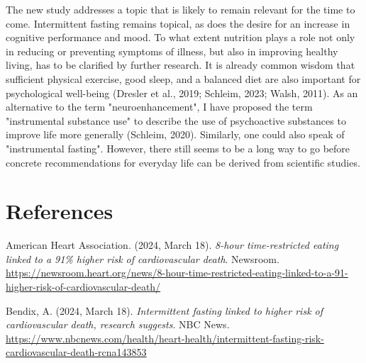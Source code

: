 \documentclass[authordate, reflection,issue]{jote-new-article}
\begin{document}
The new study addresses a topic that is likely to remain relevant for the time to come. Intermittent fasting remains topical, as does the desire for an increase in cognitive performance and mood. To what extent nutrition plays a role not only in reducing or preventing symptoms of illness, but also in improving healthy living, has to be clarified by further research. It is already common wisdom that sufficient physical exercise, good sleep, and a balanced diet are also important for psychological well-being (Dresler et al., 2019; Schleim, 2023; Walsh, 2011). As an alternative to the term "neuroenhancement", I have proposed the term "instrumental substance use" to describe the use of psychoactive substances to improve life more generally (Schleim, 2020). Similarly, one could also speak of "instrumental fasting". However, there still seems to be a long way to go before concrete recommendations for everyday life can be derived from scientific studies.



















\section{References}



\hspace*{\parindent}American Heart Association. (2024, March 18). \emph{8-hour time-restricted eating linked to a 91\% higher risk of cardiovascular death}. Newsroom. \href{https://newsroom.heart.org/news/8-hour-time-restricted-eating-linked-to-a-91-higher-risk-of-cardiovascular-death/}{https://newsroom.heart.org/news/8-hour-time-restricted-eating-linked-to-a-91-higher-risk-of-cardiovascular-death/}







Bendix, A. (2024, March 18). \emph{Intermittent fasting linked to higher risk of cardiovascular death, research suggests}. NBC News\emph{.} \url{https://www.nbcnews.com/health/heart-health/intermittent-fasting-risk-cardiovascular-death-rcna143853}
\end{document}
